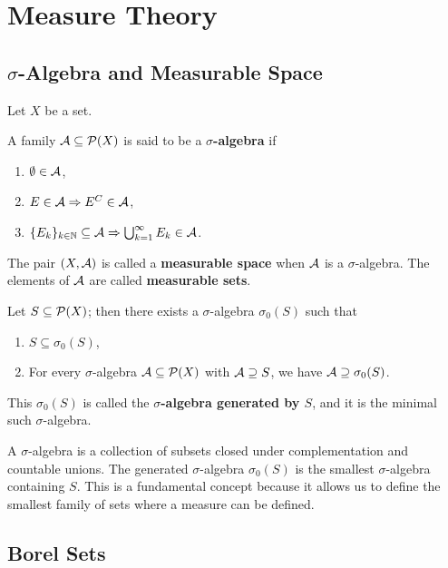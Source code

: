 \section{Measure Theory}

\subsection{$\sigma$-Algebra and Measurable Space}
Let $X$ be a set.

\begin{definition}
A family $\mathcal{A} \subseteq \mathcal{P}(X)$ is said to be a \textbf{$\sigma$-algebra} if
\begin{enumerate}
    \item $\emptyset \in \mathcal{A}$,
    \item $E \in \mathcal{A} \Rightarrow E^C \in \mathcal{A}$,
    \item $\{E_k\}_{k \in \mathbb{N}} \subseteq \mathcal{A} \Rightarrow \bigcup_{k=1}^{\infty} E_k \in \mathcal{A}$.
\end{enumerate}
The pair $(X, \mathcal{A})$ is called a \textbf{measurable space} when $\mathcal{A}$ is a $\sigma$-algebra.
The elements of $\mathcal{A}$ are called \textbf{measurable sets}.
\end{definition}

\begin{theorem}
Let $S \subseteq \mathcal{P}(X)$; then there exists a $\sigma$-algebra $\sigma_0(S)$ such that
\begin{enumerate}
    \item $S \subseteq \sigma_0(S)$,
    \item For every $\sigma$-algebra $\mathcal{A} \subseteq \mathcal{P}(X)$ with $\mathcal{A} \supseteq S$, we have $\mathcal{A} \supseteq \sigma_0(S)$.
\end{enumerate}
This $\sigma_0(S)$ is called the \textbf{$\sigma$-algebra generated by $S$}, and it is the minimal such $\sigma$-algebra.
\end{theorem}

\begin{remark}
A $\sigma$-algebra is a collection of subsets closed under complementation and countable unions. The generated $\sigma$-algebra $\sigma_0(S)$ is the smallest $\sigma$-algebra containing $S$. This is a fundamental concept because it allows us to define the smallest family of sets where a measure can be defined.
\end{remark}

\subsection{Borel Sets}

